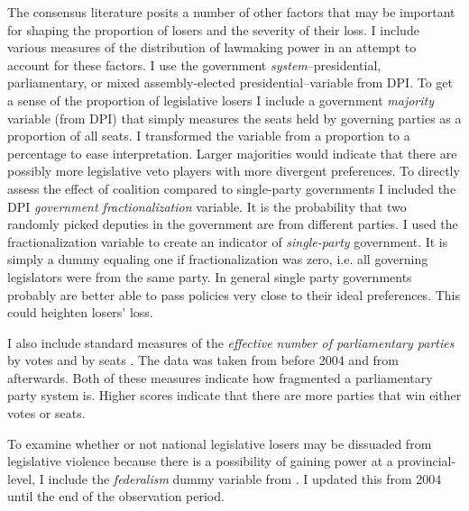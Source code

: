 \documentclass[a4paper]{article}\usepackage{graphicx, color}
\begin{document}
{The consensus literature posits a number of other factors that may be important for shaping the proportion of losers and the severity of their loss. I include various measures of the distribution of lawmaking power in an attempt to account for these factors. I use the government {\emph{system}}--presidential, parliamentary, or mixed assembly-elected presidential--variable from DPI. To get a sense of the proportion of legislative losers I include a government {\emph{majority}} variable (from DPI) that simply measures the seats held by governing parties as a proportion of all seats. I transformed the variable from a proportion to a percentage to ease interpretation. Larger majorities would indicate that there are possibly more legislative veto players with more divergent preferences. To directly assess the effect of coalition compared to single-party governments I included the DPI {\emph{government fractionalization}} variable. It is the probability that two randomly picked deputies in the government are from different parties. I used the fractionalization variable to create an indicator of {\emph{single-party}} government. It is simply a dummy equaling one if fractionalization was zero, i.e. all governing legislators were from the same party. In general single party governments probably are better able to pass policies very close to their ideal preferences. This could heighten losers' loss.

I also include standard measures of the \emph{effective number of parliamentary parties} by votes and by seats \citep[see][]{Laakso1979, Taagepera1989}. The data was taken from \cite{Carey2011} before 2004 and from \cite{Gallagher2012} afterwards. Both of these measures indicate how fragmented a parliamentary party system is. Higher scores indicate that there are more parties that win either votes or seats.

To examine whether or not national legislative losers may be dissuaded from legislative violence because there is a possibility of gaining power at a provincial-level, I include the \emph{federalism} dummy variable from \cite{Carey2011}. I updated this from 2004 until the end of the observation period.

}
\end{document}
